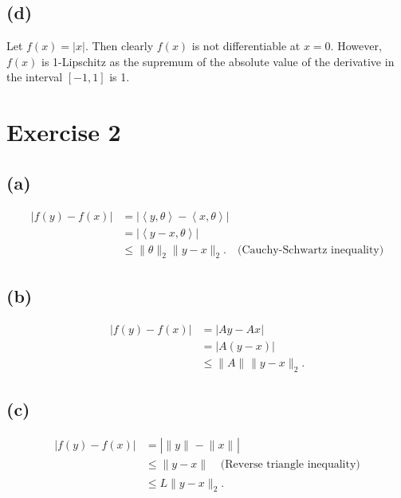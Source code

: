 \subsection*{(d)}
Let $f(x) = |x|$. Then clearly $f(x)$ is not differentiable at $x = 0$. However, $f(x)$ is 1-Lipschitz as 
the supremum of the absolute value of the derivative in the interval $[-1, 1]$ is 1.


\newpage
\section*{Exercise 2}
\subsection*{(a)}
\begin{align*}
	|f(y) - f(x)| 
	&= |\left\langle y, \theta \right\rangle - \left\langle x, \theta \right\rangle| \\
	&= |\left\langle y - x, \theta \right\rangle| \\
	&\leq \lVert \theta \rVert_{2} \lVert y - x \rVert_{2}. \quad \text{(Cauchy-Schwartz inequality)}
\end{align*}

\subsection*{(b)}
\begin{align*}
	|f(y) - f(x)| 
	&= |Ay - Ax| \\
	&= |A(y - x)| \\
	&\leq \lVert A \rVert_{} \lVert y - x \rVert_{2}.
\end{align*}

\subsection*{(c)}
\begin{align*}
	|f(y) - f(x)| 
	&= |\lVert y \rVert_{} - \lVert x \rVert_{}| \\
	&\leq \lVert y - x \rVert_{} \quad \text{(Reverse triangle inequality)} \\
	&\leq L \lVert y - x \rVert_{2}.
\end{align*}
